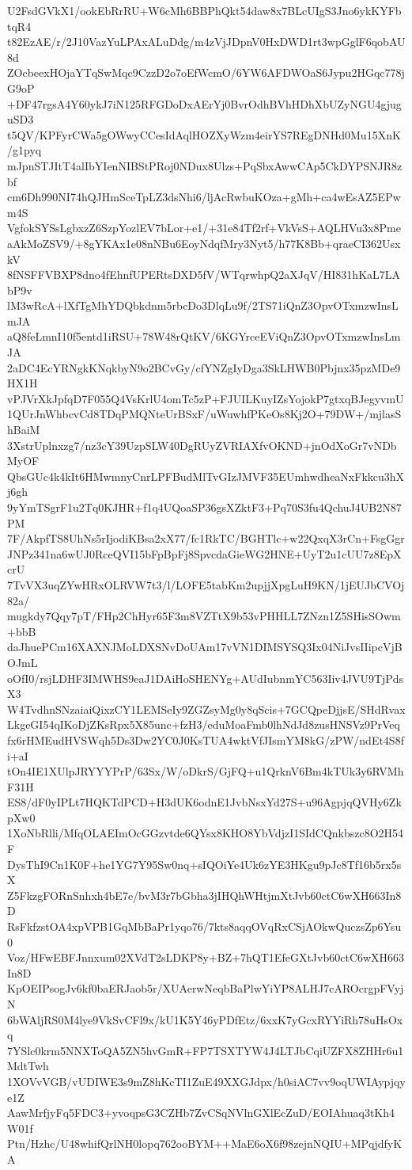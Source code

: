 U2FsdGVkX1/ookEbRrRU+W6cMh6BBPhQkt54daw8x7BLcUIgS3Jno6ykKYFbtqR4
t82EzAE/r/2J10VazYuLPAxALuDdg/m4zVjJDpnV0HxDWD1rt3wpGglF6qobAU8d
ZOcbeexHOjaYTqSwMqc9CzzD2o7oEfWcmO/6YW6AFDWOaS6Jypu2HGqc778jG9oP
+DF47rgsA4Y60ykJ7iN125RFGDoDxAErYj0BvrOdhBVhHDhXbUZyNGU4gjuguSD3
t5QV/KPFyrCWa5gOWwyCCesIdAqlHOZXyWzm4eirYS7REgDNHd0Mu15XnK/g1pyq
mJpnSTJItT4alIbYIenNIBStPRoj0NDux8Ulzs+PqSbxAwwCAp5CkDYPSNJR8zbf
cm6Dh990NI74hQJHmSceTpLZ3dsNhi6/ljAcRwbuKOza+gMh+ca4wEsAZ5EPwm4S
VgfokSYSsLgbxzZ6SzpYozlEV7bLor+e1/+31e84Tf2rf+VkVsS+AQLHVu3x8Pme
aAkMoZSV9/+8gYKAx1e08nNBu6EoyNdqfMry3Nyt5/h77K8Bb+qraeCI362UsxkV
8fNSFFVBXP8dno4fEhnfUPERtsDXD5fV/WTqrwhpQ2aXJqV/HI831hKaL7LAbP9v
lM3wRcA+lXfTgMhYDQbkdnm5rbcDo3DlqLu9f/2TS71iQnZ3OpvOTxmzwInsLmJA
aQ8feLmnI10f5entd1iRSU+78W48rQtKV/6KGYrceEViQnZ3OpvOTxmzwInsLmJA
2aDC4EcYRNgkKNqkbyN9o2BCvGy/cfYNZgIyDga3SkLHWB0Pbjnx35pzMDe9HX1H
vPJVrXkJpfqD7F055Q4VsKrlU4omTc5zP+FJUILKuyIZsYojokP7gtxqBJegyvmU
1QUrJnWhbcvCd8TDqPMQNteUrBSxF/uWuwhfPKeOs8Kj2O+79DW+/mjlasShBaiM
3XstrUplnxzg7/nz3cY39UzpSLW40DgRUyZVRIAXfvOKND+jnOdXoGr7vNDbMyOF
QbsGUc4k4kIt6HMwmnyCnrLPFBudMlTvGIzJMVF35EUmhwdheaNxFkkcu3hXj6gh
9yYmTSgrF1u2Tq0KJHR+f1q4UQoaSP36gsXZktF3+Pq70S3fu4QchuJ4UB2N87PM
7F/AkpfTS8UhNs5rIjodiKBsa2xX77/fc1RkTC/BGHTlc+w22QxqX3rCn+FsgGgr
JNPz341na6wUJ0RceQVI15bFpBpFj8SpvcdaGieWG2HNE+UyT2u1cUU7z8EpXcrU
7TvVX3uqZYwHRxOLRVW7t3/l/LOFE5tabKm2upjjXpgLuH9KN/1jEUJbCVOj82a/
mugkdy7Qqy7pT/FHp2ChHyr65F3m8VZTtX9b53vPHHLL7ZNzn1Z5SHisSOwm+bbB
daJhuePCm16XAXNJMoLDXSNvDoUAm17vVN1DIMSYSQ3Ix04NiJvsIIipcVjBOJmL
oOfI0/rsjLDHF3IMWHS9eaJ1DAiHoSHENYg+AUdIubnmYC563Iiv4JVU9TjPdsX3
W4TvdhnSNzaiaiQixzCY1LEMSeIy9ZGZsyMg0y8qScis+7GCQpeDjjsE/SHdRvax
LkgeGI54qIKoDjZKsRpx5X85unc+fzH3/eduMoaFmb0lhNdJd8zusHNSVz9PrVeq
fx6rHMEudHVSWqh5Ds3Dw2YC0J0KsTUA4wktVfJIsmYM8kG/zPW/ndEt4S8fi+aI
tOn4IE1XUlpJRYYYPrP/63Sx/W/oDkrS/GjFQ+u1QrknV6Bm4kTUk3y6RVMhF31H
ES8/dF0yIPLt7HQKTdPCD+H3dUK6odnE1JvbNsxYd27S+u96AgpjqQVHy6ZkpXw0
1XoNbRlli/MfqOLAEImOcGGzvtde6QYsx8KHO8YbVdjzI1SIdCQnkbszc8O2H54F
DysThI9Cn1K0F+he1YG7Y95Sw0nq+sIQOiYe4Uk6zYE3HKgu9pJc8Tf16b5rx5sX
Z5FkzgFORnSnhxh4bE7e/bvM3r7bGbha3jIHQhWHtjmXtJvb60ctC6wXH663In8D
RsFkfzstOA4xpVPB1GqMbBaPr1yqo76/7kts8aqqOVqRxCSjAOkwQuczsZp6Ysu0
Voz/HFwEBFJnnxum02XVdT2sLDKP8y+BZ+7hQT1EfeGXtJvb60ctC6wXH663In8D
KpOEIPsogJv6kf0baERJaob5r/XUAerwNeqbBaPlwYiYP8ALHJ7cAROcrgpFVyjN
6bWAljRS0M4lye9VkSvCFl9x/kU1K5Y46yPDfEtz/6xxK7yGcxRYYiRh78uHsOxq
7YSlc0krm5NNXToQA5ZN5hvGmR+FP7TSXTYW4J4LTJbCqiUZFX8ZHHr6u1MdtTwh
1XOVvVGB/vUDIWE3s9mZ8hKcTI1ZuE49XXGJdpx/h0siAC7vv9oqUWIAypjqye1Z
AawMrfjyFq5FDC3+yvoqpsG3CZHb7ZvCSqNVlnGXlEcZuD/EOIAhuaq3tKh4W01f
Ptn/Hzhc/U48whifQrlNH0lopq762ooBYM++MaE6oX6f98zejnNQIU+MPqjdfyKA
